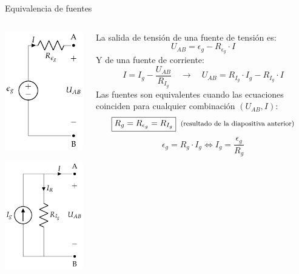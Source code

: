 \documentclass[aspectratio=169, xcolor={usenames,svgnames,dvipsnames}]{beamer}
\begin{document}

\begin{frame}{Equivalencia de fuentes}
    \begin{columns}
    \begin{column}{0.25\columnwidth}
        \begin{center}
        \includegraphics[height=0.43\textheight]{../figs/FuenteTensionRealDC.pdf}
        \end{center}
    
        \begin{center}
        \includegraphics[height=0.43\textheight]{../figs/FuenteCorrienteRealDC.pdf}
        \end{center}
    \end{column}
    
    \begin{column}{0.75\columnwidth}
        La salida de tensión de una fuente de tensión es:
        \[
          U_{AB} = \epsilon_g - R_{\epsilon_g} \cdot I
        \]
        Y de una fuente de corriente:
        \[
          I = I_g - \frac{U_{AB}}{R_{I_g}} \quad \rightarrow \quad U_{AB} = R_{I_g} \cdot I_g - R_{I_g} \cdot I
        \]
        Las \alert{fuentes son equivalentes cuando} las ecuaciones coinciden para cualquier combinación \((U_{AB}, I)\):
        \[
            \boxed{R_g = R_{\epsilon_g} = R_{I_g}} \;\; \textrm{\footnotesize{(resultado de la diapositiva anterior)}}
        \]
        \[
          \boxed{\epsilon_g = R_g \cdot I_g} \Leftrightarrow \boxed{I_g = \frac{\epsilon_g}{R_g}}
        \]
    \end{column}
    \end{columns}
\end{frame}
\end{document}
